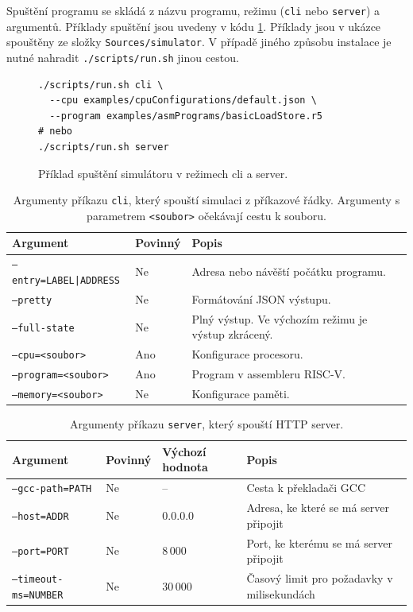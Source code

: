 Spuštění programu se skládá z názvu programu, režimu (\texttt{cli} nebo \texttt{server}) a argumentů.
Příklady spuštění jsou uvedeny v kódu \ref{runshExample}.
Příklady jsou v ukázce spouštěny ze složky \texttt{Sources/simulator}.
V případě jiného způsobu instalace je nutné nahradit \texttt{./scripts/run.sh} jinou cestou.

\begin{figure}[hbtp]
\begin{lstlisting}[]
./scripts/run.sh cli \
  --cpu examples/cpuConfigurations/default.json \
  --program examples/asmPrograms/basicLoadStore.r5
# nebo
./scripts/run.sh server
\end{lstlisting}
\caption{Příklad spuštění simulátoru v režimech cli a server.}
\label{runshExample}
\end{figure}

\begin{table}[!ht]
    \centering
    \begin{tabular}{|l|l|l|}
    \hline
        Argument & Povinný & Popis \\ \hline\hline
        \texttt{--entry=LABEL|ADDRESS} & Ne & Adresa nebo návěští počátku programu. \\ 
        \texttt{--pretty} & Ne & Formátování JSON výstupu. \\ 
        \texttt{--full-state} & Ne & Plný výstup. Ve výchozím režimu je výstup zkrácený. \\
        \texttt{--cpu=<soubor>} & Ano & Konfigurace procesoru. \\ 
        \texttt{--program=<soubor>} & Ano & Program v assembleru RISC-V. \\ 
        \texttt{--memory=<soubor>} & Ne & Konfigurace paměti. \\ \hline
    \end{tabular}
    \caption{Argumenty příkazu \texttt{cli}, který spouští simulaci z příkazové řádky. Argumenty s parametrem \texttt{<soubor>} očekávají cestu k souboru.}
    \label{cliArgsTable}
\end{table}

\begin{table}[!ht]
    \centering
    \begin{tabular}{|l|l|l|p{6cm}|}
    \hline
        Argument & Povinný & Výchozí hodnota & Popis \\ \hline\hline
        \texttt{--gcc-path=PATH} & Ne & -- & Cesta k překladači GCC \\
        \texttt{--host=ADDR} & Ne & 0.0.0.0 & Adresa, ke které se má server připojit \\
        \texttt{--port=PORT} & Ne & 8\,000  & Port, ke kterému se má server připojit \\
        \texttt{--timeout-ms=NUMBER} & Ne & 30\,000 & Časový limit pro požadavky v milisekundách \\ \hline
    \end{tabular}
    \caption{Argumenty příkazu \texttt{server}, který spouští HTTP server.}
    \label{serverArgsTable}
\end{table}


